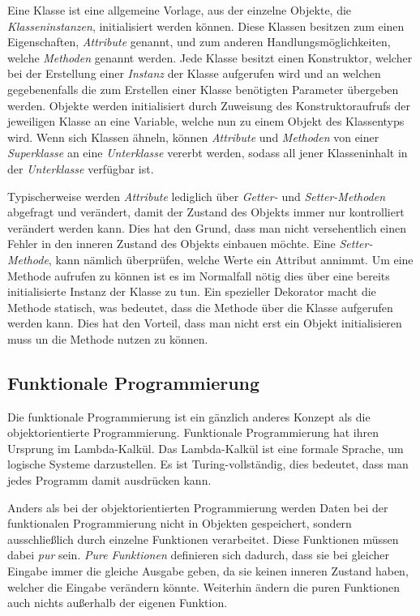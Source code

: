 \documentclass[]{dsadokumentation}
\begin{document}
Eine Klasse ist eine allgemeine Vorlage, aus der einzelne Objekte, die \emph{Klasseninstanzen}, initialisiert werden können. Diese Klassen besitzen zum einen Eigenschaften, \emph{Attribute} genannt, und zum anderen Handlungsmöglichkeiten, welche \emph{Methoden} genannt werden. Jede Klasse besitzt einen Konstruktor, welcher bei der Erstellung einer \emph{Instanz} der Klasse aufgerufen wird und an welchen gegebenenfalls die zum Erstellen einer Klasse benötigten Parameter übergeben werden. Objekte werden initialisiert durch Zuweisung des Konstruktoraufrufs der jeweiligen Klasse an eine Variable, welche nun zu einem Objekt des Klassentyps wird. Wenn sich Klassen ähneln, können \emph{Attribute} und \emph{Methoden} von einer \emph{Superklasse} an eine \emph{Unterklasse} vererbt werden, sodass all jener Klasseninhalt in der \emph{Unterklasse} verfügbar ist.

Typischerweise werden \emph{Attribute} lediglich über \emph{Getter-} und \emph{Setter-Methoden} abgefragt und verändert, damit der Zustand des Objekts immer nur kontrolliert verändert werden kann. Dies hat den Grund, dass man nicht versehentlich einen Fehler in den inneren Zustand des Objekts einbauen möchte. Eine \emph{Setter-Methode}, kann nämlich überprüfen, welche Werte ein Attribut annimmt. Um eine Methode aufrufen zu können ist es im Normalfall nötig dies über eine bereits initialisierte Instanz der Klasse zu tun. Ein spezieller Dekorator macht die Methode statisch, was bedeutet, dass die Methode über die Klasse aufgerufen werden kann. Dies hat den Vorteil, dass man nicht erst ein Objekt initialisieren muss un die Methode nutzen zu können.

\subsection{Funktionale Programmierung}
Die funktionale Programmierung ist ein gänzlich anderes Konzept als die objektorientierte Programmierung. Funktionale Programmierung hat ihren Ursprung im Lambda-Kalkül. Das Lambda-Kalkül ist eine formale Sprache, um logische Systeme darzustellen. Es ist Turing-vollständig, dies bedeutet, dass man jedes Programm damit ausdrücken kann.

Anders als bei der objektorientierten Programmierung werden Daten bei der funktionalen Programmierung nicht in Objekten gespeichert, sondern ausschließlich durch einzelne Funktionen verarbeitet. Diese Funktionen müssen dabei \emph{pur} sein. \emph{Pure Funktionen} definieren sich dadurch, dass sie bei gleicher Eingabe immer die gleiche Ausgabe geben, da sie keinen inneren Zustand haben, welcher die Eingabe verändern könnte. Weiterhin ändern die puren Funktionen auch nichts außerhalb der eigenen Funktion.
\end{document}

